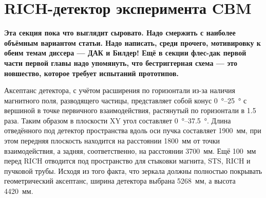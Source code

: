 \section{RICH-детектор эксперимента CBM}\label{sec:secCBMrich}

\textbf{Эта секция пока что выглядит сыровато. Надо смержить с наиболее объёмным вариантом статьи. Надо написать, среди прочего, мотивировку к обеим темам диссера --- ДАК и Билдер! Ещё в секции флес-дак первой части первой главы надо упомянуть, что бестриггерная схема --- это новшество, которое требует испытаний прототипов.}






Аксептанс детектора, с учётом расширения по горизонтали из-за наличия магнитного поля, разводящего частицы, представляет собой конус \SI{0}{\degree}--\SI{25}{\degree} с вершиной в точке первичного взаимодействия, растянутый по горизонтали в 1.5 раза. Таким образом в плоскости XY угол составляет \SI{0}{\degree}--\SI{37.5}{\degree}.
Длина отведённого под детектор пространства вдоль оси пучка составляет 1900~мм, при этом передняя плоскость находится на расстоянии 1800~мм от точки взаимодействия, а задняя, соответственно, на расстоянии 3700~мм. Ещё 100~мм перед RICH отводится под пространство для стыковки магнита, STS, RICH и пучковой трубы. Исходя из того факта, что зеркала должны полностью покрывать геометрический аксептанс, ширина детектора выбрана 5268~мм, а высота 4420~мм.

